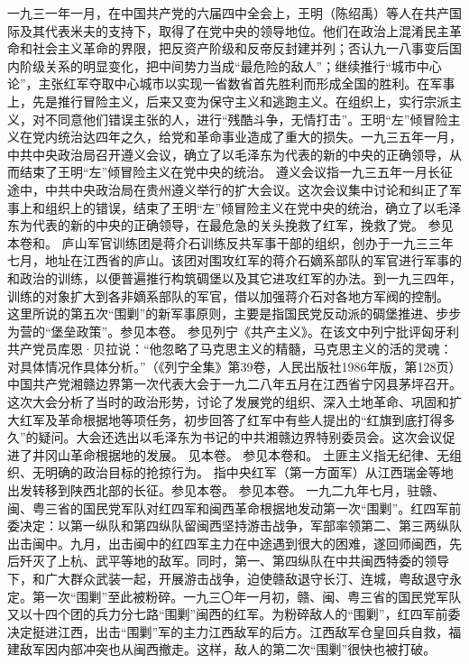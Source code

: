 \begin{maonote}
一九三一年一月，在中国共产党的六届四中全会上，王明（陈绍禹）等人在共产国际及其代表米夫的支持下，取得了在党中央的领导地位。他们在政治上混淆民主革命和社会主义革命的界限，把反资产阶级和反帝反封建并列；否认九一八事变后国内阶级关系的明显变化，把中间势力当成“最危险的敌人”；继续推行“城市中心论”，主张红军夺取中心城市以实现一省数省首先胜利而形成全国的胜利。在军事上，先是推行冒险主义，后来又变为保守主义和逃跑主义。在组织上，实行宗派主义，对不同意他们错误主张的人，进行“残酷斗争，无情打击”。王明“左”倾冒险主义在党内统治达四年之久，给党和革命事业造成了重大的损失。一九三五年一月，中共中央政治局召开遵义会议，确立了以毛泽东为代表的新的中央的正确领导，从而结束了王明“左”倾冒险主义在党中央的统治。
遵义会议指一九三五年一月长征途中，中共中央政治局在贵州遵义举行的扩大会议。这次会议集中讨论和纠正了军事上和组织上的错误，结束了王明“左”倾冒险主义在党中央的统治，确立了以毛泽东为代表的新的中央的正确领导，在最危急的关头挽救了红军，挽救了党。
参见本卷和。
庐山军官训练团是蒋介石训练反共军事干部的组织，创办于一九三三年七月，地址在江西省的庐山。该团对围攻红军的蒋介石嫡系部队的军官进行军事的和政治的训练，以便普遍推行构筑碉堡以及其它进攻红军的办法。到一九三四年，训练的对象扩大到各非嫡系部队的军官，借以加强蒋介石对各地方军阀的控制。
这里所说的第五次“围剿”的新军事原则，主要是指国民党反动派的碉堡推进、步步为营的“堡垒政策”。参见本卷。
参见列宁《共产主义》。在该文中列宁批评匈牙利共产党员库恩·贝拉说：“他忽略了马克思主义的精髓，马克思主义的活的灵魂：对具体情况作具体分析。”（《列宁全集》第39卷，人民出版社1986年版，第128页）
中国共产党湘赣边界第一次代表大会于一九二八年五月在江西省宁冈县茅坪召开。这次大会分析了当时的政治形势，讨论了发展党的组织、深入土地革命、巩固和扩大红军及革命根据地等项任务，初步回答了红军中有些人提出的“红旗到底打得多久”的疑问。大会还选出以毛泽东为书记的中共湘赣边界特别委员会。这次会议促进了井冈山革命根据地的发展。
见本卷。
参见本卷和。
土匪主义指无纪律、无组织、无明确的政治目标的抢掠行为。
指中央红军（第一方面军）从江西瑞金等地出发转移到陕西北部的长征。参见本卷。
参见本卷。
一九二九年七月，驻赣、闽、粤三省的国民党军队对红四军和闽西革命根据地发动第一次“围剿”。红四军前委决定：以第一纵队和第四纵队留闽西坚持游击战争，军部率领第二、第三两纵队出击闽中。九月，出击闽中的红四军主力在中途遇到很大的困难，遂回师闽西，先后歼灭了上杭、武平等地的敌军。同时，第一、第四纵队在中共闽西特委的领导下，和广大群众武装一起，开展游击战争，迫使赣敌退守长汀、连城，粤敌退守永定。第一次“围剿”至此被粉碎。一九三〇年一月初，赣、闽、粤三省的国民党军队又以十四个团的兵力分七路“围剿”闽西的红军。为粉碎敌人的“围剿”，红四军前委决定挺进江西，出击“围剿”军的主力江西敌军的后方。江西敌军仓皇回兵自救，福建敌军因内部冲突也从闽西撤走。这样，敌人的第二次“围剿”很快也被打破。

\end{maonote}
